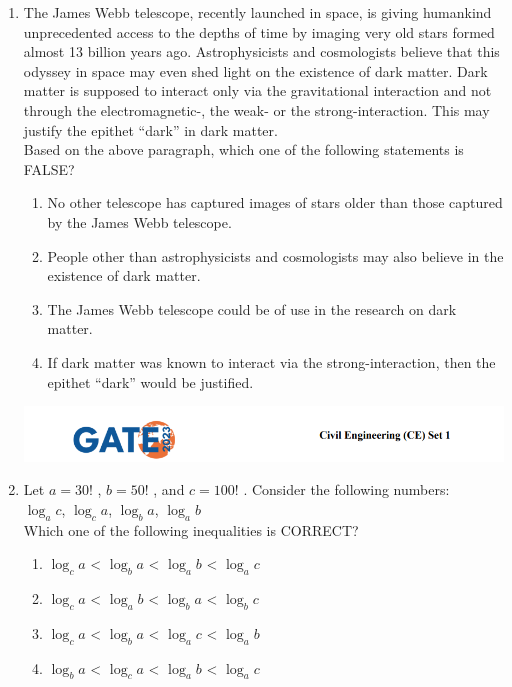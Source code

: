\documentclass[journal,14pt,onecolumn]{IEEEtran}
\theoremstyle{remark}
\begin{document}
\begin{enumerate}[label={Q\arabic*.}]
\item The James Webb telescope, recently launched in space, is giving humankind
unprecedented access to the depths of time by imaging very old stars formed almost 13 billion years ago. Astrophysicists and cosmologists believe that this odyssey in space may even shed light on the existence of dark matter. Dark matter is supposed to interact only via the gravitational interaction and not through the electromagnetic-, the weak- or the strong-interaction. This may justify the epithet “dark” in dark matter.\\
Based on the above paragraph, which one of the following statements is FALSE?
\begin{enumerate}
    \item No other telescope has captured images of stars older than those captured by the James Webb telescope.
    \item People other than astrophysicists and cosmologists may also believe in the existence of dark matter.
    \item The James Webb telescope could be of use in the research on dark matter.
    \item If dark matter was known to interact via the strong-interaction, then the epithet “dark” would be justified.
\end{enumerate}

\newpage

\includegraphics[width=\textwidth]{pics/header.png}
\item Let $a = 30!$ , $b = 50!$ , and $c = 100!$ . Consider the following numbers:\\
$\log_{a}c$,\hspace{2cm} $\log_{c}a$,\hspace{2cm} $\log_{b}a$, \hspace{2cm} $\log_{a}b$\\
Which one of the following inequalities is CORRECT?
\begin{enumerate}
    \item $\log_{c}a$ < $\log_{b}a$ < $\log_{a}b$ < $\log_{a}c$
    \item $\log_{c}a$ < $\log_{a}b$ < $\log_{b}a$ < $\log_{b}c$
    \item $\log_{c}a$ < $\log_{b}a$ < $\log_{a}c$ < $\log_{a}b$
    \item $\log_{b}a$ < $\log_{c}a$ < $\log_{a}b$ < $\log_{a}c$
\end{enumerate}
\vspace{1cm}


\end{enumerate}
\end{document}
